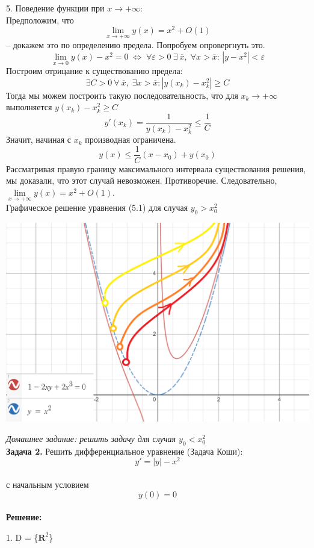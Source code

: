 \documentclass[10pt]{report}
\begin{document}
5. Поведение функции при $x\to +\infty$:\\
Предположим, что
\[ \lim\limits_{x\to +\infty} y(x) = x^2+O(1)\] -- докажем это по определению предела. Попробуем опровергнуть это.
\[ \lim\limits_{x\to 0} y(x) - x^2 =0  \; \Leftrightarrow \; \forall \varepsilon >0 \: \exists \: \overline{x}, \; \forall x > \overline{x}: \, |y-x^2|<\varepsilon\] 
Построим отрицание к существованию предела:\\
\[\exists C >0 \: \forall  \: \overline{x}, \; \exists  x > \overline{x}: |y(x_k) - x_k^2| \geq C\]
Тогда мы можем построить такую последовательность, что для $x_k \rightarrow +\infty $  выполняется $y(x_k) - x_k^2\geq C$
\[ y'(x_k) = \frac 1 {y(x_k) - x_k^2} \leq \frac 1 C\]
Значит, начиная  с $x_k$ производная ограничена.
\[y(x) \leq \frac 1 C (x-x_0) + y(x_0)\]
Рассматривая правую границу максимального интервала существования решения, мы доказали, что этот случай невозможен. Противоречие. Следовательно, $ \lim\limits_{x\to +\infty} y(x) = x^2+O(1)$.\\
Графическое решение уравнения (5.1) для случая $y_0>x_0^2$\\
\begin{center}
{\includegraphics[scale=0.4]{graph5.2.png}} 
\end{center}
\textit{Домашнее задание: решить задачу для случая $y_0<x_0^2$}\\

\textbf{Задача 2.} Решить дифференциальное уравнение (Задача Коши): 
\newline
\begin{equation}
y' = |y| - x^2
\end{equation}\\
с начальным условием
\begin{equation}
y(0)=0
\end{equation}\\
\textbf{Решение:} \par
1. D = \{$\textbf{R}^2$\}
\end{document}
